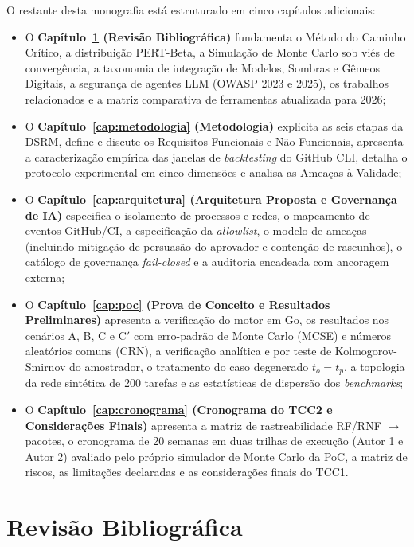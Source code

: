 \documentclass[12pt,openany,oneside,a4paper,english,brazilian,sumario=tradicional]{abntex2}
\begin{document}
O restante desta monografia está estruturado em cinco capítulos adicionais:
\begin{itemize}
  \item O \textbf{Capítulo~\ref{cap:revisao} (Revisão Bibliográfica)} fundamenta o Método do Caminho Crítico, a distribuição PERT-Beta, a Simulação de Monte Carlo sob viés de convergência, a taxonomia de integração de Modelos, Sombras e Gêmeos Digitais, a segurança de agentes LLM (OWASP 2023 e 2025), os trabalhos relacionados e a matriz comparativa de ferramentas atualizada para 2026;
  \item O \textbf{Capítulo~\ref{cap:metodologia} (Metodologia)} explicita as seis etapas da DSRM, define e discute os Requisitos Funcionais e Não Funcionais, apresenta a caracterização empírica das janelas de \textit{backtesting} do GitHub CLI, detalha o protocolo experimental em cinco dimensões e analisa as Ameaças à Validade;
  \item O \textbf{Capítulo~\ref{cap:arquitetura} (Arquitetura Proposta e Governança de IA)} especifica o isolamento de processos e redes, o mapeamento de eventos GitHub/CI, a especificação da \textit{allowlist}, o modelo de ameaças (incluindo mitigação de persuasão do aprovador e contenção de rascunhos), o catálogo de governança \textit{fail-closed} e a auditoria encadeada com ancoragem externa;
  \item O \textbf{Capítulo~\ref{cap:poc} (Prova de Conceito e Resultados Preliminares)} apresenta a verificação do motor em Go, os resultados nos cenários A, B, C e C$'$ com erro-padrão de Monte Carlo (MCSE) e números aleatórios comuns (CRN), a verificação analítica e por teste de Kolmogorov-Smirnov do amostrador, o tratamento do caso degenerado $t_o=t_p$, a topologia da rede sintética de 200 tarefas e as estatísticas de dispersão dos \textit{benchmarks};
  \item O \textbf{Capítulo~\ref{cap:cronograma} (Cronograma do TCC2 e Considerações Finais)} apresenta a matriz de rastreabilidade RF/RNF $\rightarrow$ pacotes, o cronograma de 20 semanas em duas trilhas de execução (Autor 1 e Autor 2) avaliado pelo próprio simulador de Monte Carlo da PoC, a matriz de riscos, as limitações declaradas e as considerações finais do TCC1.
\end{itemize}

\chapter{Revisão Bibliográfica}\label{cap:revisao}
\end{document}
